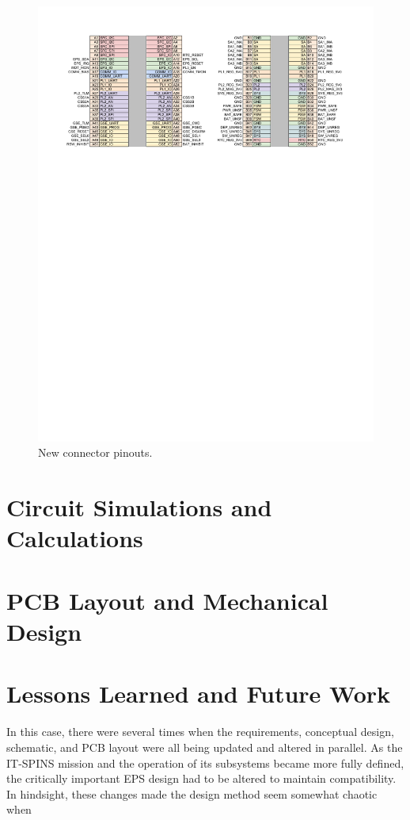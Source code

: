 \begin{figure}[htbp]
	\centering
	\includegraphics[width=\textwidth]{../figs/phoenix/concept/new_bus.pdf}
	\caption{New connector pinouts.}
	\label{fig:eps_bus}
\end{figure}

\section{Circuit Simulations and Calculations}\label{Sect:eps_calc}



\section{PCB Layout and Mechanical Design}\label{Sect:eps_pcb}



\section{Lessons Learned and Future Work}\label{Sect:eps_results}

In this case, there were several times when the requirements, conceptual design, schematic, and PCB layout were all being updated and altered in parallel. As the IT-SPINS mission and the operation of its subsystems became more fully defined, the critically important EPS design had to be altered to maintain compatibility. In hindsight, these changes made the design method seem somewhat chaotic when 